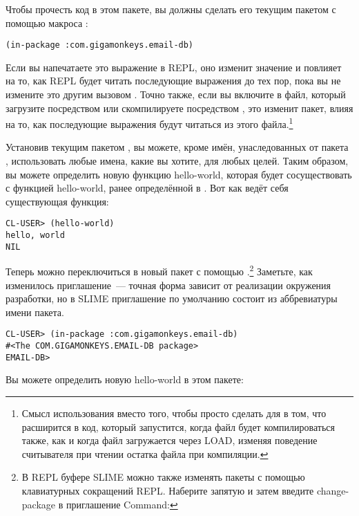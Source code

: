 Чтобы прочесть код в этом пакете, вы должны сделать его текущим пакетом с помощью макроса
:

\begin{lstlisting}
(in-package :com.gigamonkeys.email-db)
\end{lstlisting}

Если вы напечатаете это выражение в REPL, оно изменит значение  и повлияет
на то, как REPL будет читать последующие выражения до тех пор, пока вы не измените это
другим вызовом . Точно также, если вы включите  в файл,
который загрузите посредством  или скомпилируете посредством
, это изменит пакет, влияя на то, как последующие выражения будут
читаться из этого файла.\footnote{Смысл использования  вместо того,
  чтобы просто сделать  для  в том, что 
  расширится в код, который запустится, когда файл будет компилироваться
   также, как и когда файл загружается через LOAD, изменяя поведение
  считывателя при чтении остатка файла при компиляции.}

Установив текущим пакетом , вы можете, кроме имён,
унаследованных от пакета , использовать любые имена, какие вы хотите,
для любых целей. Таким образом, вы можете определить новую функцию hello-world, которая
будет сосуществовать с функцией hello-world, ранее определённой в
. Вот как ведёт себя существующая функция:

\begin{lstlisting}
CL-USER> (hello-world)
hello, world
NIL
\end{lstlisting}

Теперь можно переключиться в новый пакет с помощью .\footnote{В REPL
буфере SLIME можно также изменять пакеты с помощью клавиатурных сокращений REPL. Наберите
запятую и затем введите change-package в приглашение Command:} Заметьте, как изменилось
приглашение~--- точная форма зависит от реализации окружения разработки, но в SLIME
приглашение по умолчанию состоит из аббревиатуры имени пакета.

\begin{lstlisting}
CL-USER> (in-package :com.gigamonkeys.email-db)
#<The COM.GIGAMONKEYS.EMAIL-DB package>
EMAIL-DB> 
\end{lstlisting}

Вы можете определить новую hello-world в этом пакете:


